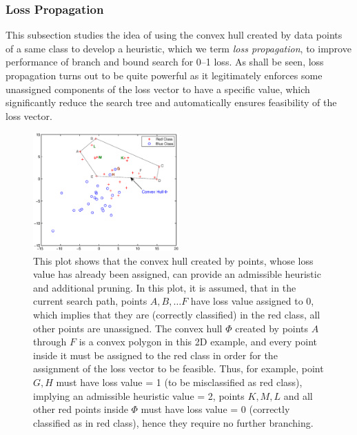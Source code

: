 \subsubsection{Loss Propagation}
\label{sec:bnb.heuristic}

This subsection studies the idea of using the convex hull created by data points of a same class to develop a heuristic, which we term \emph{loss propagation}, to improve performance of branch and bound search for 0--1 loss. As shall be seen, loss propagation turns out to be quite powerful as it legitimately enforces some unassigned components of the loss vector to have a specific value, which significantly reduce the search tree and automatically ensures feasibility of the loss vector. 

\begin{figure}[here]
\includegraphics[width=0.50\textwidth]{images/fig32_convexhull.eps}
\caption{
This plot shows that the convex hull created by points, whose loss value has already been assigned, can provide an admissible heuristic and additional pruning.
In this plot, it is assumed, that in the current search path, points $A, B, \dots F$ have loss value assigned to 0, which implies that they are (correctly classified) in the red class, all other points are unassigned. The convex hull $\Phi$ created by points $A$ through $F$ is a convex polygon in this 2D example, and every point inside it must be assigned to the red class in order for the assignment of the loss vector to be feasible. Thus, for example, point $G, H$ must have loss value = 1 (to be misclassified as red class), implying an admissible heuristic value = 2, points $K, M, L$ and all other red points inside $\Phi$ must have loss value = 0 (correctly classified as in red class), hence they require no further branching.
}
\label{fig:convexhull}
\end{figure} 


